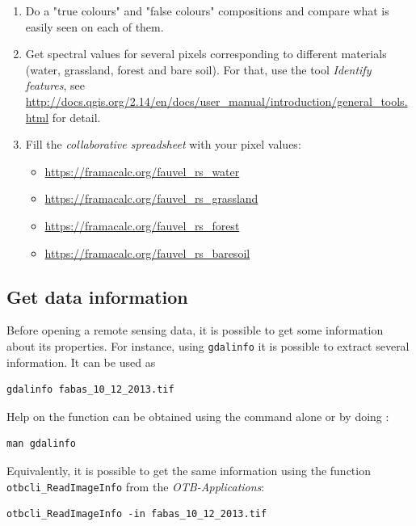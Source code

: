 \documentclass[a4paper,11pt,DIV=18]{scrartcl}
\begin{document}
\begin{work}
\begin{enumerate}
\item Do a "true colours" and "false colours" compositions and compare what
is easily seen on each of them.
\item Get spectral  values for several pixels  corresponding to different
materials  (water,  grassland,  forest  and bare  soil). For that,
use the tool \emph{Identify features}, see
\url{http://docs.qgis.org/2.14/en/docs/user_manual/introduction/general_tools.html}
for detail.
\item Fill  the \emph{collaborative spreadsheet}  with your pixel values:
\begin{itemize}
\item \url{https://framacalc.org/fauvel_rs_water}
\item \url{https://framacalc.org/fauvel_rs_grassland}
\item \url{https://framacalc.org/fauvel_rs_forest}
\item \url{https://framacalc.org/fauvel_rs_baresoil}
\end{itemize}
\end{enumerate}
\end{work}
\subsection{Get data information}
\label{sec:orgheadline18}
Before  opening a  remote sensing  data, it  is possible  to get  some
information about its  properties. For instance, using  \texttt{gdalinfo} it is
possible to extract several information.  It can be used as

\begin{verbatim}
gdalinfo fabas_10_12_2013.tif
\end{verbatim}

Help  on the function  can be obtained using  the command alone or by
doing :

\begin{verbatim}
man gdalinfo
\end{verbatim}

Equivalently, it is possible to get the same information using the
function \texttt{otbcli\_ReadImageInfo} from the \emph{OTB-Applications}:

\begin{verbatim}
otbcli_ReadImageInfo -in fabas_10_12_2013.tif
\end{verbatim}
\end{document}

